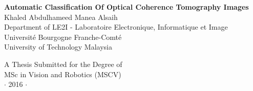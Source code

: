 

\newpage
\thispagestyle{empty}


\vspace*{2cm}
\begin{center}
{\Large\bf Automatic Classification Of Optical Coherence Tomography Images\\} \vspace{2cm} {\large
Khaled Abdulhameed Manea Alsaih\\
\vspace{2cm}
Department of LE2I - Laboratoire Electronique, Informatique et Image \\
Universit\'e Bourgogne Franche-Comt\'e \\
University of Technology Malaysia }
\end{center}

\vspace{7cm}
\begin{center}
{\large A Thesis Submitted for the Degree of \\MSc
in Vision and Robotics (MSCV) \\\vspace{0.3cm} $\cdot$ 2016
$\cdot$}
\end{center}
\singlespacing


